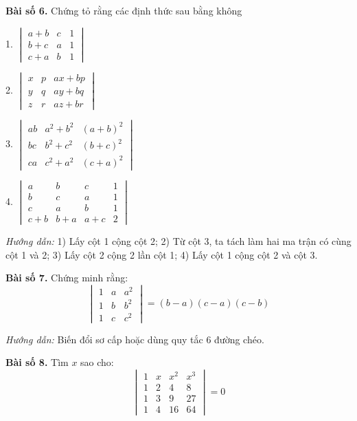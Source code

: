 \textbf{Bài số 6.} Chứng tỏ rằng các định thức sau bằng không

1. \(\begin{vmatrix}
a + b & c & 1 \\
b + c & a & 1 \\
c + a & b & 1
\end{vmatrix}\)
\vspace*{0.5cm}

2. \(\begin{vmatrix}
x & p & ax + bp \\
y & q & ay + bq \\
z & r & az + br
\end{vmatrix}\)
\vspace*{0.5cm}

3. \(\begin{vmatrix}
    ab & a^2 + b^2 & (a + b)^2 \\
    bc & b^2 + c^2 & (b + c)^2 \\
    ca & c^2 + a^2 & (c + a)^2
    \end{vmatrix}\)
    \vspace*{0.5cm}
    
    4. \(\begin{vmatrix}
    a & b & c & 1 \\
    b & c & a & 1 \\
    c & a & b & 1 \\
    c + b & b + a & a + c & 2
    \end{vmatrix}\)
    \vspace*{0.5cm}
    
    \textit{Hướng dẫn:}
    1) Lấy cột 1 cộng cột 2;
    2) Từ cột 3, ta tách làm hai ma trận có cùng cột 1 và 2;
    3) Lấy cột 2 cộng 2 lần cột 1;
    4) Lấy cột 1 cộng cột 2 và cột 3.
    
    \textbf{Bài số 7.} Chứng minh rằng:
    \[
    \begin{vmatrix}
    1 & a & a^2 \\
    1 & b & b^2 \\
    1 & c & c^2
    \end{vmatrix} = (b - a)(c - a)(c - b)
    \]
    
    \textit{Hướng dẫn:} Biến đổi sơ cấp hoặc dùng quy tắc 6 đường chéo.
    
    \textbf{Bài số 8.} Tìm \(x\) sao cho:
    \[
    \begin{vmatrix}
    1 & x & x^2 & x^3 \\
    1 & 2 & 4 & 8 \\
    1 & 3 & 9 & 27 \\
    1 & 4 & 16 & 64
    \end{vmatrix} = 0
    \]
    
